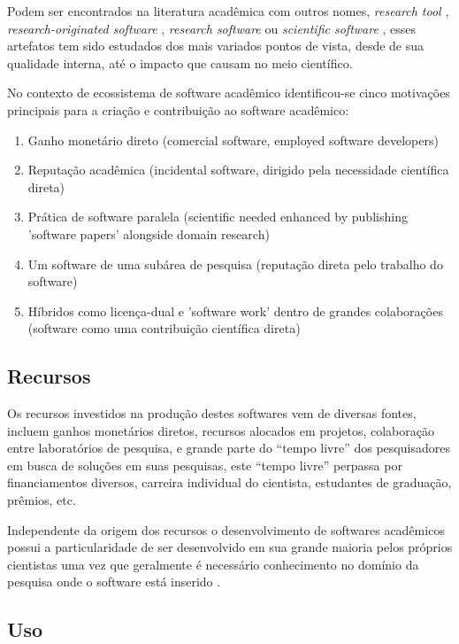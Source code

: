 Podem ser encontrados na literatura acadêmica com outros nomes,
{\it research tool} \cite{Portillo12},
{\it research-originated software} \cite{Kon2011},
{\it research software} \cite{hettrick_2014_14809} ou
{\it scientific software} \cite{segal2008developing},
esses artefatos tem sido estudados dos mais variados pontos
de vista, desde de sua qualidade interna, até o impacto que
causam no meio científico.

No contexto de ecossistema de software acadêmico identificou-se cinco
motivações principais para a criação e contribuição ao software acadêmico:

\begin{enumerate}
  \item Ganho monetário direto (comercial software, employed software developers)
  \item Reputação acadêmica (incidental software, dirigido pela necessidade científica direta)
  \item Prática de software paralela (scientific needed enhanced by publishing 'software papers' alongside domain research)
  \item Um software de uma subárea de pesquisa (reputação direta pelo trabalho do software)
  \item Híbridos como licença-dual e 'software work' dentro de grandes colaborações (software como uma contribuição científica direta)
\end{enumerate}

\subsection{Recursos}

Os recursos investidos na produção destes softwares vem de diversas fontes,
incluem ganhos monetários diretos, recursos alocados em projetos, colaboração
entre laboratórios de pesquisa, e grande parte do ``tempo livre'' dos
pesquisadores em busca de soluções em suas pesquisas, este ``tempo livre''
perpassa por financiamentos diversos, carreira individual do cientista,
estudantes de graduação, prêmios, etc.

Independente da origem dos recursos o desenvolvimento de softwares acadêmicos
possui a particularidade de ser desenvolvido em sua grande maioria pelos
próprios cientistas uma vez que geralmente é necessário conhecimento no domínio
da pesquisa onde o software está inserido \cite{segal2008developing, hettrick_2014_14809,
momcheva2015software}.

\subsection{Uso}

